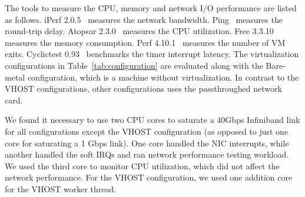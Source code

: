 The tools to measure the CPU, memory and network I/O
performance are listed as follows. iPerf 2.0.5~\cite{iperf}
measures the network bandwidth. Ping~\cite{ping} measures the
round-trip delay. Atopsar 2.3.0~\cite{atopsar} measures the
CPU utilization. Free 3.3.10~\cite{free} measures the memory
consumption. Perf 4.10.1~\cite{perf} measures the number of VM
exits. Cyclictest 0.93~\cite{cyclictest} benchmarks the timer
interrupt latency. The virtualization configurations in
Table~\ref{tab:configuration} are evaluated along with the
Bare-metal configuration, which is a machine without
virtualization. In contrast to the VHOST configurations, other
configurations uses the passthroughed network card.

We found it necessary to use two CPU cores to saturate a
40Gbps Infiniband link for all configurations except the VHOST
configuration (as opposed to just one core for saturating a 1
Gbps link). One core handled the NIC interrupts, while another
handled the soft IRQs and ran network performance testing
workload. We used the third core to monitor CPU utilization,
which did not affect the network performance. For the VHOST
configuration, we used one addition core for the VHOST worker
thread.



